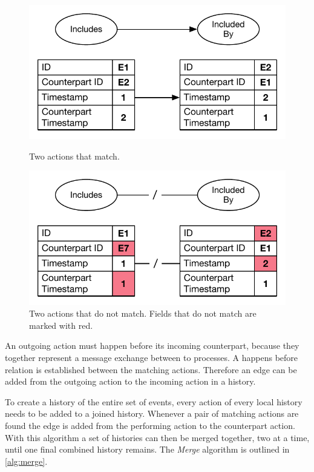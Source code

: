     \begin{figure}[H]
		\centering
		\begin{minipage}{0.45\textwidth}
			\centering
			\includegraphics[width=\textwidth]{4connect/images/actions-match.pdf}
		\caption{Two actions that match.}
		\label{fig:connect:actions-match}
		\end{minipage}\hfill
		\begin{minipage}{0.45\textwidth}
			\centering
			\includegraphics[width=\textwidth]{4connect/images/actions-do-not-match.pdf}
		\caption{Two actions that do not match. Fields that do not match are marked with red.}
		\label{fig:connect:actions-do-not-match}
		\end{minipage}
		\end{figure}
    
    \newpar An outgoing action must happen before its incoming counterpart, because they together represent a message exchange between to processes. A happens before relation is established between the matching actions. Therefore an edge can be added from the outgoing action to the incoming action in a history.

	\newpar To create a history of the entire set of events, every action of every local history needs to be added to a joined history. Whenever a pair of matching actions are found the edge is added from the performing action to the counterpart action. With this algorithm a set of histories can then be merged together, two at a time, until one final combined history remains. The \textit{Merge} algorithm is outlined in \autoref{alg:merge}.
	
